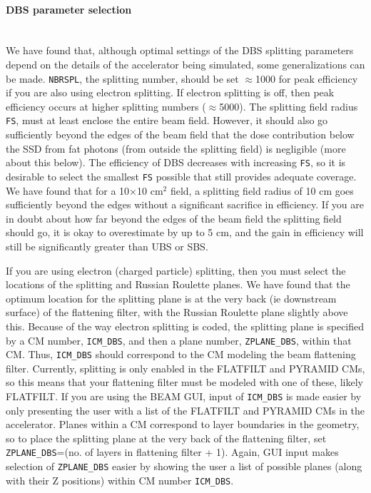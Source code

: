 \documentclass[12pt,twoside]{article}
\begin{document}
\paragraph{DBS parameter selection}\mbox{}\\
We have found that, although optimal settings of the DBS splitting parameters
depend on the details of the accelerator being simulated, some generalizations
can be made.  {\tt NBRSPL}, the splitting number, should be set
$\approx$1000 for peak efficiency if you are also using electron splitting.
If electron splitting is off, then peak efficiency occurs at
higher splitting numbers ($\approx$5000).  The splitting field radius
{\tt FS}, must at least enclose the entire beam field.  However, it should
also go sufficiently beyond the edges of the beam field that the
dose contribution below the SSD from fat photons
(from outside the splitting field) is negligible
(more about this below).  The efficiency
of DBS decreases with increasing {\tt FS}, so it is desirable to
select the smallest {\tt FS} possible that still provides adequate coverage.
We have found that for a 10$\times$10 cm$^2$ field,
a splitting field radius of 10 cm goes sufficiently beyond the edges without
a significant sacrifice in efficiency.  If you
are in doubt about how far beyond the edges of the beam field the splitting
field should go, it is okay to overestimate by up to 5 cm,
and the gain in efficiency
will still be significantly greater than UBS or SBS.

If you are using electron (charged particle) splitting, then you must
select the locations of the splitting and Russian Roulette planes.
We have found that the optimum location for the splitting plane is at
the very back (ie downstream surface) of the flattening filter, with
the Russian Roulette plane slightly above this.  Because of the
way electron splitting is coded, the splitting plane is specified
by a CM number, {\tt ICM\_DBS}, and then a plane number,
{\tt ZPLANE\_DBS}, within that CM.  Thus, {\tt ICM\_DBS}
should correspond to the CM modeling the beam flattening filter.
Currently, splitting is
only enabled in the FLATFILT and PYRAMID CMs, so this means that your flattening filter
must be modeled with one of these, likely FLATFILT.  If you are using the BEAM GUI, input of
{\tt ICM\_DBS} is made easier by only presenting the user with a list of
the FLATFILT and PYRAMID CMs in the accelerator.
Planes within a CM correspond to layer
boundaries in the geometry, so to place the splitting plane at the
very back of the flattening filter, set {\tt ZPLANE\_DBS}=(no. of layers
in flattening filter + 1).  Again, GUI input makes selection of
{\tt ZPLANE\_DBS} easier by showing the user a list of possible
planes (along with their Z positions) within CM number {\tt ICM\_DBS}.
\end{document}
